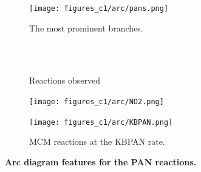 \begin{figure}[H]
     \centering
      \begin{subfigure}[b]{.4\textwidth}
         \centering
         \texttt{[image: figures\_c1/arc/pans.png]}
         \caption{The most prominent branches. }
         \label{fig:pansdir}
     \end{subfigure}
      \begin{subfigure}[b]{.4\textwidth}
         \centering
            \\ \ \\
    \hfill
         \caption{Reactions observed}
         \label{fig:rxnpan}
     \end{subfigure}
     \begin{subfigure}[b]{.4\textwidth}
         \centering
         \texttt{[image: figures\_c1/arc/NO2.png]}
         \caption{}
         \label{fig:no2}
     \end{subfigure}
     \begin{subfigure}[b]{.4\textwidth}
         \centering
         \texttt{[image: figures\_c1/arc/KBPAN.png]}
         \caption{MCM reactions at the KBPAN rate.}
         \label{fig:kbpan}
     \end{subfigure}
      \caption{\textbf{ Arc diagram features for the PAN reactions. } }
        \label{fig:panno2}
\end{figure}




